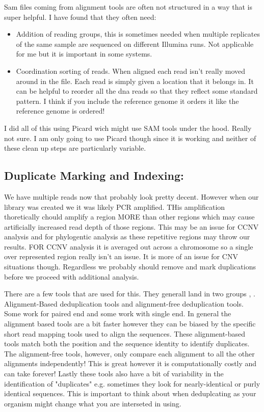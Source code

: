 \documentclass{article}
\begin{document}
     Sam files coming from alignment tools are often not structured in a way that is super helpful.   I have found that they often need: 
    \begin{itemize}
        \item Addition of reading groups, this is sometimes needed when multiple replicates of the same sample are sequenced on different Illumina runs.    Not applicable for me but it is important in some systems.
        \item Coordination sorting of reads.   When aligned each read isn't really moved around in the file.   Each read is simply given a location that it belongs in.    It can be helpful to reorder all the dna reads so that they reflect some standard pattern.  I think if you include the reference genome it orders it like the reference genome is ordered!
    \end{itemize}
    
    I did all of this using Picard wich might use SAM tools under the hood.  Really not sure.   I am only going to use Picard though since it is working and neither of these clean up steps are particularly variable.

    \newpage
    \subsection{\textbf{Duplicate Marking and Indexing:}} We have multiple reads now that probably look pretty decent.   However when our library was created we it was likely PCR amplified.   THis amplification thoretically chould amplify a region MORE than other regions which may cause artificially increased read depth of those regions.   This may be an issue for CCNV analysis and for phylogentic analysis as these repetitive regions may throw our results.    FOR CCNV analysis it is averaged out across a chromosome so a single over represented region really isn't an issue.  It is more of an issue for CNV situations though.  Regardless we probably should remove and mark duplications before we proceed with additional analysis.
    
    There are a few tools that are used for this.  They generall land in two groups \cite{manconiRemovingDuplicateReads2016},
    \cite{pingHowErrorCorrection2025}.  
    Alignment-Based deduplication tools and alignment-free deduplication tools.   Some work for paired end and some work with single end.
    In general the alignment based tools are a bit faster however they can be biased by the specific short read mapping tools used to align the sequences.   These alignment-based tools match both the position and the sequence identity to identify duplicates.  The alignment-free tools, however, only compare each alignment to all the other alignments independently!    This is great however it is computationally costly and can take forever!   Lastly these tools also have a bit of variability in the identification of "duplicates" e.g. sometimes they look for nearly-identical or purly identical sequences.   This is important to think about when deduplcating as your organism might change what you are interseted in using.
\end{document}
